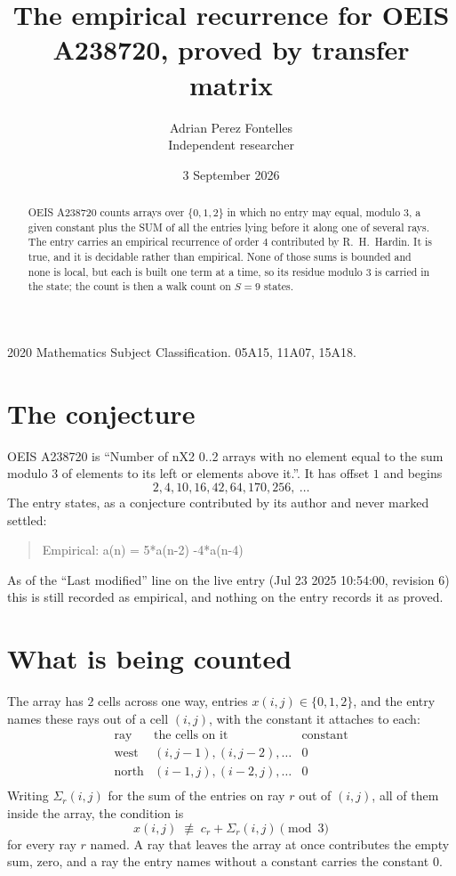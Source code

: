\documentclass[11pt,a4paper]{article}
\title{The empirical recurrence for OEIS A238720, proved by transfer matrix}
\author{Adrian Perez Fontelles\\ \small Independent researcher}
\date{3 September 2026}
\theoremstyle{plain}
\theoremstyle{definition}
\begin{document}
\maketitle

\begin{abstract}
OEIS A238720 counts arrays over $\{0,1,2\}$ in which no entry may equal, modulo $3$, a given
constant plus the SUM of all the entries lying before it along one of several rays. The entry
carries an empirical recurrence of order $4$ contributed by R.~H.~Hardin. It is true, and
it is decidable rather than empirical. None of those sums is bounded and none is local, but
each is built one term at a time, so its residue modulo $3$ is carried in the state; the
count is then a walk count on $S=9$ states.
\end{abstract}

\noindent\small 2020 Mathematics Subject Classification. 05A15, 11A07, 15A18.\normalsize

\section{The conjecture}

OEIS A238720 is ``Number of nX2 0..2 arrays with no element equal to the sum modulo 3 of elements to its left or elements above it.''. It has offset $1$ and begins
\[
2, 4, 10, 16, 42, 64, 170, 256,\ \dots
\]
The entry states, as a conjecture contributed by its author and never marked settled:
\begin{quote}
Empirical: a(n) = 5*a(n-2) -4*a(n-4)
\end{quote}
As of the ``Last modified'' line on the live entry (Jul 23 2025 10:54:00, revision 6) this is still
recorded as empirical, and nothing on the entry records it as proved.

\section{What is being counted}

The array has $2$ cells across one way, entries $x(i,j)\in\{0,1,2\}$, and the entry names these
rays out of a cell $(i,j)$, with the constant it attaches to each:
\[
\begin{array}{lll}
\text{ray} & \text{the cells on it} & \text{constant} \\[2pt]
\text{west} & (i,j-1),(i,j-2),\dots & 0 \\
\text{north} & (i-1,j),(i-2,j),\dots & 0 \\
\end{array}
\]
Writing $\Sigma_r(i,j)$ for the sum of the entries on ray $r$ out of $(i,j)$, all of them
inside the array, the condition is
\[
x(i,j)\;\not\equiv\;c_r+\Sigma_r(i,j) \pmod{3}
\]
for every ray $r$ named. A ray that leaves the array at once contributes the empty sum,
zero, and a ray the entry names without a constant carries the constant $0$.
\end{document}
